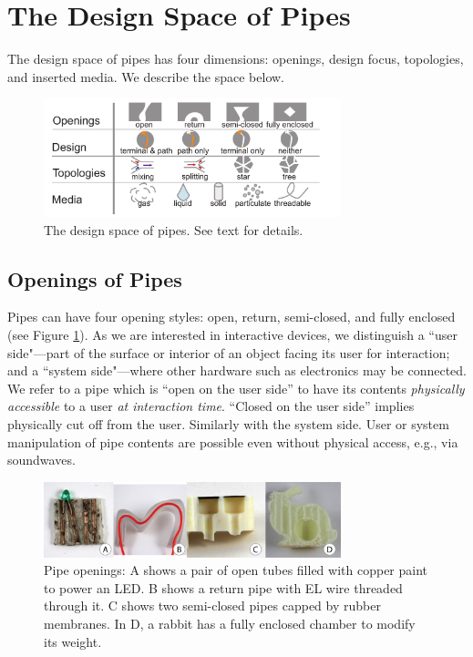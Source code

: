 \section{The Design Space of Pipes}
The design space of pipes has four dimensions: openings, design focus, topologies, and inserted media.  We describe the space below.

\begin{figure}[h!]
\centering
    \includegraphics[width=3.4in]{figures/tubespace.pdf}
\caption{The design space of pipes.  See text for details.}
\label{fig:pipespace}
\end{figure}

\subsection{Openings of Pipes}

Pipes can have four opening styles: open, return, semi-closed, and fully enclosed (see Figure \ref{fig:pipespace}).  As we are interested in interactive devices, we distinguish a ``user side"---part of the surface or interior of an object facing its user for interaction; and a ``system side"---where other hardware such as electronics may be connected.  We refer to a pipe which is ``open on the user side'' to have its contents \emph{physically accessible} to a user \emph{at interaction time}.  ``Closed on the user side'' implies physically cut off from the user.  Similarly with the system side.  User or system manipulation of pipe contents are possible even without physical access, e.g., via soundwaves.

\begin{figure}[h]
\centering
    \includegraphics[width=3.4in]{figures/types.png}
\caption{Pipe openings: A shows a pair of open tubes filled with copper paint to power an LED.  B shows a return pipe with EL wire threaded through it.  C shows two semi-closed pipes capped by rubber membranes.  In D, a rabbit has a fully enclosed chamber to modify its weight.}
\label{fig:openings}
\end{figure}

